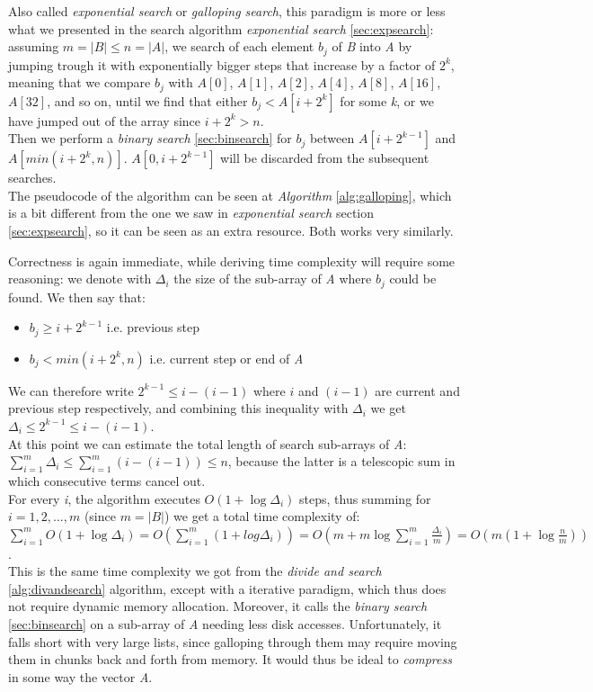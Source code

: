 Also called \textit{exponential search} or \textit{galloping search}, this paradigm is more or less what we presented in the search algorithm \textit{exponential search} \ref{sec:expsearch}: assuming $m=|B| \leq n=|A|$, we search of each element $b_j$ of \textit{B} into \textit{A} by jumping trough it with exponentially bigger steps that increase by a factor of $2^k$, meaning that we compare $b_j$ with $A[0]$, $A[1]$, $A[2]$, $A[4]$, $A[8]$, $A[16]$, $A[32]$, and so on, until we find that either $b_j<A\left[i+2^k\right]$ for some \textit{k}, or we have jumped out of the array since $i+2^k>n$.\\
Then we perform a \textit{binary search} \ref{sec:binsearch} for $b_j$ between $A\left[i+2^{k-1}\right]$ and $A\left[min\left(i+2^k, n\right)\right]$. $A\left[0, i+2^{k-1}\right]$ will be discarded from the subsequent searches.\\
The pseudocode of the algorithm can be seen at \textit{Algorithm} \ref{alg:galloping}, which is a bit different from the one we saw in \textit{exponential search} section \ref{sec:expsearch}, so it can be seen as an extra resource. Both works very similarly.

Correctness is again immediate, while deriving time complexity will require some reasoning: we denote with $\Delta_i$ the size of the sub-array of \textit{A} where $b_j$ could be found.
We then say that:
\begin{itemize} 
    \item $b_j \geq i+2^{k-1}$ i.e. previous step
    \item $b_j<min\left(i+2^k,n\right)$ i.e. current step or end of \textit{A}
\end{itemize}

We can therefore write $2^{k-1} \leq i-(i-1)$ where $i$ and $(i-1)$ are current and previous step respectively, and combining this inequality with $\Delta_i$ we get $\Delta_i \leq 2^{k-1} \leq i-(i-1)$. \\
At this point we can estimate the total length of search sub-arrays of \textit{A}: $\sum_{i=1}^{m} \Delta_i \leq \sum_{i=1}^{m} (i-(i-1)) \leq n$, because the latter is a telescopic sum in which consecutive terms cancel out.\\
For every \textit{i}, the algorithm executes $O\left(1+ \log \Delta_i\right)$ steps, thus summing for $i = 1,2,...,m$ (since $m=|B|$) we get a total time complexity of:\\
$\sum_{i=1}^m O\left(1+ \log \Delta_i\right)=O\left(\sum_{i=1}^{m}\left(1+log \Delta_i\right)\right)=O\left(m+m \log \sum_{i=1}^m \frac{\Delta_i}{m}\right)=O\left(m\left(1+ \log \frac{n}{m}\right)\right)$.\\
This is the same time complexity we got from the \textit{divide and search} \ref{alg:divandsearch} algorithm, except with a iterative paradigm, which thus does not require dynamic memory allocation. Moreover, it calls the \textit{binary search} \ref{sec:binsearch} on a sub-array of \textit{A} needing less disk accesses. Unfortunately, it falls short with very large lists, since galloping through them may require moving them in chunks back and forth from memory. It would thus be ideal to \textit{compress} in some way the vector \textit{A}.

